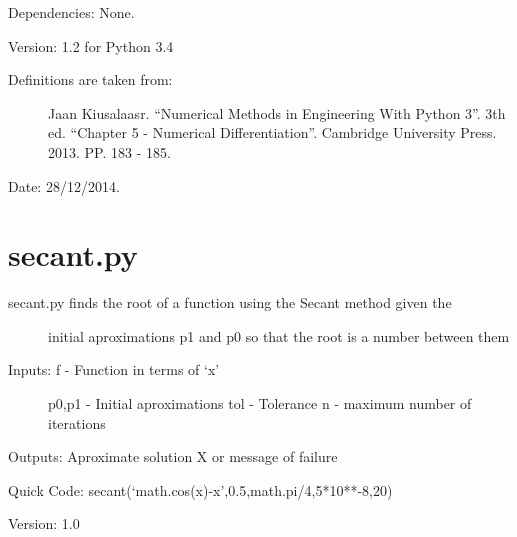 \documentclass[letterpaper,10pt,oneside]{sphinxmanual}
\theoremstyle{plain}%
\theoremstyle{definition}%
\theoremstyle{remark}%
\begin{document}
Dependencies: None.

Version: 1.2 for Python 3.4
\begin{description}
\item[{Definitions are taken from:}] \leavevmode
Jaan Kiusalaasr. ``Numerical Methods in Engineering With Python 3''.
3th ed. ``Chapter 5 - Numerical Differentiation''. 
Cambridge University Press. 2013. PP. 183 - 185.

\end{description}




Date: 28/12/2014.


\section{secant.py}
\label{code:module-secant}\label{code:secant-py}\begin{description}
\item[{secant.py finds the root of a function using the Secant method given the}] \leavevmode
initial aproximations p1 and p0 so that the root is a number between them

\item[{Inputs: f - Function in terms of `x'}] \leavevmode
p0,p1 - Initial aproximations
tol - Tolerance
n - maximum number of iterations

\end{description}

Outputs: Aproximate solution X or message of failure

Quick Code: secant(`math.cos(x)-x',0.5,math.pi/4,5*10**-8,20)

Version: 1.0
\end{document}
